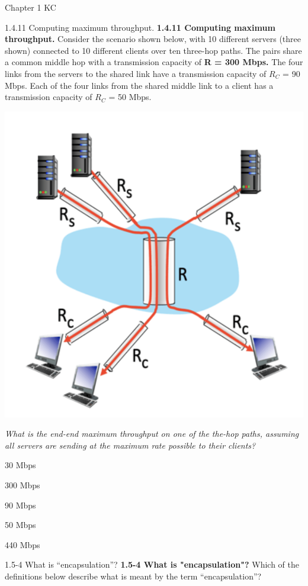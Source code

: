 \documentclass[a4paper]{article}
\begin{document}
\begin{quiz}{Chapter 1 KC}
\begin{multi}[points=1]{1.4.11 Computing maximum throughput.}
\textbf{1.4.11 Computing maximum throughput.} 
Consider the scenario shown below, with 10 different servers (three shown) connected to 10 different clients over ten three-hop paths. The pairs share a common middle hop with a transmission capacity of \textbf{R = 300 Mbps.} The four links from the servers to the shared link have a transmission capacity of $R_C$ = 90 Mbps. Each of the four links from the shared middle link to a client has a transmission capacity of $R_C$ = 50 Mbps.
\begin{center}
\includegraphics[width=\linewidth]{figs/1.4.11.png}
\end{center}

\emph{What is the end-end maximum throughput on one of the the-hop paths, assuming all servers are sending at the maximum rate possible to their clients?}
\item* 30 Mbps
\item 300 Mbps
\item 90 Mbps
\item 50 Mbps
\item 440 Mbps
\end{multi}

\begin{multi}[points=1]{1.5-4 What is ``encapsulation''?}
\textbf{1.5-4 What is "encapsulation"?} 
Which of the definitions below describe what is meant by the term ``encapsulation''?


\end{multi}
\end{quiz}
\end{document}
